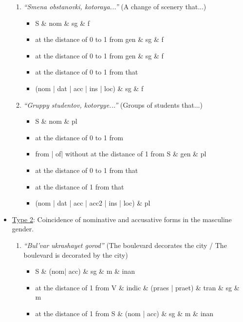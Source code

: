 \documentclass[11pt]{article}
\begin{document}
\begin{itemize}[leftmargin=1em,noitemsep,topsep=0.1pt]
\begin{enumerate}[leftmargin=0.5em,noitemsep,topsep=0.1pt]
        \item \textit{``Smena obstanovki, kotoraya...''} (A change of scenery that...)
        
        \begin{itemize}[noitemsep,topsep=0.1pt]
            \item S \& nom \& sg \& f
            \item at the distance of 0 to 1 from gen \& sg \& f 
            \item at the distance of 0 to 1 from gen \& sg \& f
            \item at the distance of 0 to 1 from that
            \item (nom | dat | acc | ins | loc) \& sg \& f
        \end{itemize}
        
        \item \textit{``Gruppy studentov, kotoryye...''} (Groups of students that...)
        
        \begin{itemize}[noitemsep,topsep=0.1pt]
            \item S \& nom \& pl
            \item at the distance of 0 to 1 from 
            \item from | of| without at the distance of 1 from S \& gen \& pl
            \item at the distance of 0 to 1 from that
            \item at the distance of 1 from  that
            \item (nom | dat | acc | acc2 | ins | loc) \& pl
        \end{itemize}

    \end{enumerate}
    
    \item \underline{Type 2}: Coincidence of nominative and accusative forms in the masculine gender.
    
    \begin{enumerate}[leftmargin=0.5em,noitemsep,topsep=0.1pt]
        \item \textit{``Bul'var ukrashayet gorod''} (The boulevard decorates the city / The boulevard is decorated by the city)
        
        \begin{itemize}[noitemsep,topsep=0.1pt]
            \item S \& (nom| acc) \& sg \& m \& inan
            \item at the distance of 1 from V \& indic \& (praes | praet) \& tran \& sg \& m 
            \item at the distance of 1 from S \& (nom | acc) \& sg \& m \& inan
        \end{itemize}
        

\end{enumerate}
\end{itemize}
\end{document}
